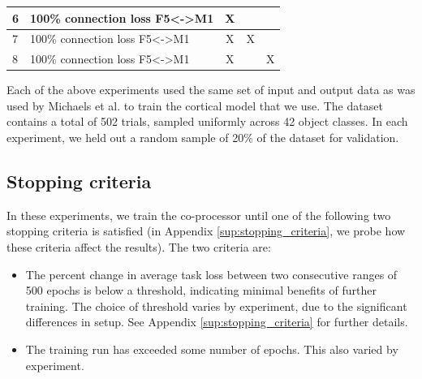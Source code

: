 \documentclass[12pt]{iopart}
\begin{document}
\begin{table}[h]
\begin{tabular}{|l|l|c|c|c|}
6              & 100\% connection loss F5\textless{}-\textgreater{}M1 & X                                                                                               &                                                                                                &                                                                                                 \\ \hline
7              & 100\% connection loss F5\textless{}-\textgreater{}M1 & X                                                                                               & X                                                                                              &                                                                                                 \\ \hline
8              & 100\% connection loss F5\textless{}-\textgreater{}M1 & X                                                                                               &                                                                                                & X                                                                                               \\ \hline
\end{tabular}
\end{table}

Each of the above experiments used the same set of input and output data as was used by
Michaels et al. \cite{michaels.mrnn} to train the cortical model that we use. The dataset
contains a total of 502 trials, sampled uniformly across 42 object classes. In each experiment,
we held out a random sample of 20\% of the dataset for validation.

\subsection{Stopping criteria}
In these experiments, we train the co-processor until one of the following two stopping criteria is
satisfied (in Appendix \ref{sup:stopping_criteria}, we probe how these criteria
affect the results). The two criteria are:

\begin{itemize}
	\item The percent change in average task loss between two consecutive ranges of 500 epochs
	      is below a threshold, indicating minimal benefits of further training. The choice of
              threshold varies by experiment, due to the significant differences in setup. See Appendix
              \ref{sup:stopping_criteria} for further details.
	\item The training run has exceeded some number of epochs. This also varied by experiment.
\end{itemize}
\end{document}
